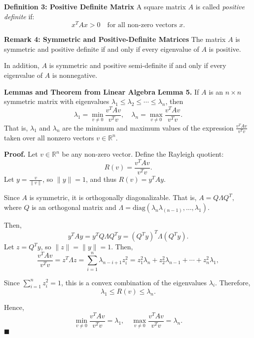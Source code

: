 \documentclass[aspectratio=169]{beamer}
\begin{document}
\begin{frame}
\textbf{\large Definition 3: Positive Definite Matrix}  
  A square matrix $A$ is called \textit{positive definite} if:
  \[
    x^T A x > 0 \quad \text{for all non-zero vectors } x.
  \]

  \vspace{1em}

  \textbf{\large Remark 4: Symmetric and Positive-Definite Matrices}  
  The matrix $A$ is symmetric and positive definite if and only if every eigenvalue of $A$ is positive. 
  
  In addition, $A$ is symmetric and positive semi-definite if and only if every eigenvalue of $A$ is nonnegative. 
\end{frame}

\begin{frame}{\textbf{Lemmas and Theorem from Linear Algebra}}
    \textbf{Lemma 5.}  
If \( A \) is an \( n \times n \) symmetric matrix with eigenvalues \( \lambda_1 \leq \lambda_2 \leq \cdots \leq \lambda_n \), then
\[
\lambda_1 = \min_{v \neq 0} \frac{v^T A v}{v^T v}, \quad \lambda_n = \max_{v \neq 0} \frac{v^T A v}{v^T v}.
\]
That is, \( \lambda_1 \) and \( \lambda_n \) are the minimum and maximum values of the expression \( \frac{v^T A v}{v^T v} \) taken over all nonzero vectors \( v \in \mathbb{R}^n \).

\textbf{Proof.}  
Let \( v \in \mathbb{R}^n \) be any non-zero vector. Define the Rayleigh quotient:
\[
R(v) = \frac{v^T A v}{v^T v}.
\]
Let \( y = \frac{v}{\|v\|} \), so \( \|y\| = 1 \), and thus \( R(v) = y^T A y \).
\end{frame}

\begin{frame}
    

Since \( A \) is symmetric, it is orthogonally diagonalizable. That is,
\(
A = Q \Lambda Q^T,
\)
where \( Q \) is an orthogonal matrix and \( \Lambda = \text{diag}(\lambda_n \lambda_(n-1), \ldots, \lambda_1) \).

Then,
\[
y^T A y = y^T Q \Lambda Q^T y = (Q^T y)^T \Lambda (Q^T y).
\]
Let \( z = Q^T y \), so \( \|z\| = \|y\| = 1 \). Then,
\[
\frac{v^T A v}{v^T v} = z^T \Lambda z = \sum_{i=1}^n \lambda_{n - i + 1} z_i^2 = z_1^2 \lambda_n + z_2^2 \lambda_{n-1} + \cdots + z_n^2 \lambda_1,
\]


Since \( \sum_{i=1}^n z_i^2 = 1 \), this is a convex combination of the eigenvalues \( \lambda_i \). Therefore,
\[
\lambda_1 \leq R(v) \leq \lambda_n.
\]

Hence,
\[
\min_{v \neq 0} \frac{v^T A v}{v^T v} = \lambda_1, \quad \max_{v \neq 0} \frac{v^T A v}{v^T v} = \lambda_n.
\]
\hfill \(\blacksquare\)

\end{frame}
\end{document}
